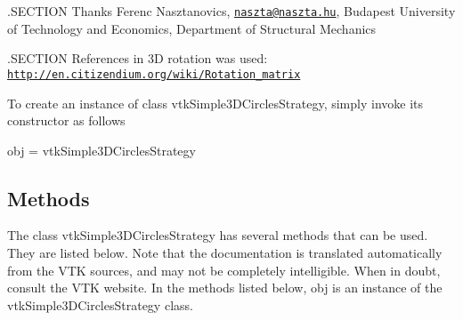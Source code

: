 .S\-E\-C\-T\-I\-O\-N Thanks Ferenc Nasztanovics, \href{mailto:naszta@naszta.hu}{\tt naszta@naszta.\-hu}, Budapest University of Technology and Economics, Department of Structural Mechanics

.S\-E\-C\-T\-I\-O\-N References in 3\-D rotation was used\-: \href{http://en.citizendium.org/wiki/Rotation_matrix}{\tt http\-://en.\-citizendium.\-org/wiki/\-Rotation\-\_\-matrix}

To create an instance of class vtk\-Simple3\-D\-Circles\-Strategy, simply invoke its constructor as follows \begin{DoxyVerb}  obj = vtkSimple3DCirclesStrategy
\end{DoxyVerb}
 \hypertarget{vtkwidgets_vtkxyplotwidget_Methods}{}\subsection{Methods}\label{vtkwidgets_vtkxyplotwidget_Methods}
The class vtk\-Simple3\-D\-Circles\-Strategy has several methods that can be used. They are listed below. Note that the documentation is translated automatically from the V\-T\-K sources, and may not be completely intelligible. When in doubt, consult the V\-T\-K website. In the methods listed below, {\ttfamily obj} is an instance of the vtk\-Simple3\-D\-Circles\-Strategy class. 
